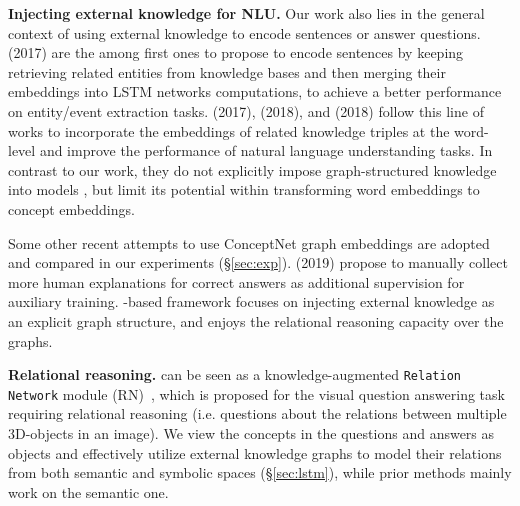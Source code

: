 \documentclass[11pt,a4paper]{article}
\newcommand{\secref}[1]{\S\ref{#1}}
\begin{document}
\smallskip
\noindent
\textbf{Injecting external knowledge for NLU.}  
Our work also lies in the general context of using external knowledge to encode sentences or answer questions. 
\citeauthor{Yang2017LeveragingKB} (2017) are the among first ones to propose to encode sentences by keeping retrieving related entities from knowledge bases and then merging their embeddings into LSTM networks computations, to achieve a better performance on entity/event extraction tasks.
\citeauthor{weissenborn2017dynamic} (2017), 
\citeauthor{Mihaylov2018KnowledgeableRE} (2018), and \citeauthor{Annervaz2018LearningBD} (2018) follow this line of works to incorporate the embeddings of related knowledge triples at the word-level and improve the performance of natural language understanding tasks.
In contrast to our work,
they do not explicitly impose graph-structured knowledge into models
, but limit its potential within transforming word embeddings to concept embeddings.

Some other recent attempts \cite{Zhong2018ImprovingQA, Wang2018ImprovingNL} to use ConceptNet graph embeddings are adopted and compared in our experiments (\secref{sec:exp}).
\citeauthor{Rajani2019ExplainYL} (2019) propose to manually collect more human explanations for correct answers as additional supervision for auxiliary training.
\KagNet-based framework focuses on injecting external knowledge as an explicit graph structure, and enjoys the relational reasoning capacity over the graphs.



\smallskip
\noindent
\textbf{Relational reasoning.}  
\KagNet can be seen as a knowledge-augmented \texttt{Relation Network} module (RN)~\cite{Santoro2017ASN}, which is proposed for the visual question answering task requiring relational reasoning (i.e. questions about the relations between multiple 3D-objects in an image). 
We view the concepts in the questions and answers as objects and effectively utilize external knowledge graphs to model their relations from both semantic and symbolic spaces (\secref{sec:lstm}), while prior methods mainly work on the semantic one.
\end{document}
